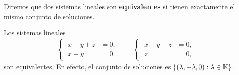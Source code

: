 \begin{block}
	Diremos que dos sistemas lineales son \textbf{equivalentes} si tienen
	exactamente el mismo conjunto de soluciones.	
\end{block}

\begin{block}
	Los sistemas lineales 
	\begin{align*}
		\begin{cases}
			\begin{aligned}
				x+y+z&=0,\\
				x+y&=0,
			\end{aligned}
		\end{cases}
		&&
		\begin{cases}
			\begin{aligned}
				x+y+z&=0,\\
				z&=0,
			\end{aligned}
		\end{cases}
	\end{align*}
	son equivalentes. En efecto, el conjunto de soluciones es
	$\{(\lambda,-\lambda,0): \lambda\in\mathbb{K}\}$.
\end{block}

